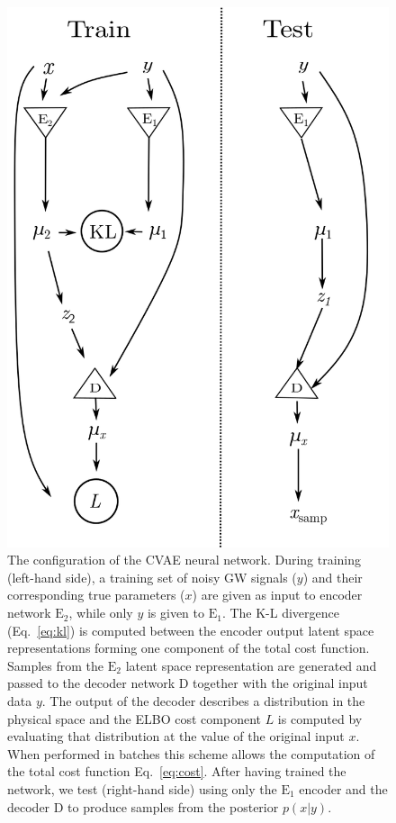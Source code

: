 \documentclass[%
showpacs,
 amsmath,amssymb,
 aps,
 twocolumn,
 prl,
 reprint,
floatfix,
]{revtex4-1}
\begin{document}
\begin{figure}
    \includegraphics[width=\columnwidth]{images/network_setup.png}
    \caption{\label{fig:network_config} The configuration of the \ac{CVAE} neural
network. During training (left-hand side), a training set of noisy \ac{GW}
signals ($y$) and their corresponding true parameters ($x$) are given as input
to encoder network $\textrm{E}_2$, while only $y$ is given to $\textrm{E}_1$.
The K-L divergence (Eq.~\ref{eq:kl}) is computed between the encoder output
latent space representations forming one component of the total cost function.
Samples from the $\text{E}_{2}$ latent space representation are generated and
passed to the decoder network D together with the original input data $y$.  The
output of the decoder describes a distribution in the physical space and the
\ac{ELBO} cost component $L$ is computed by evaluating that distribution at the
value of the original input $x$. When performed in batches this scheme allows
the computation of the total cost function Eq.~\ref{eq:cost}.  After having
trained the network, we test (right-hand side) using only the $\textrm{E}_1$
encoder and the decoder D to produce samples from the posterior $p(x|y)$.}
\end{figure}
\end{document}
